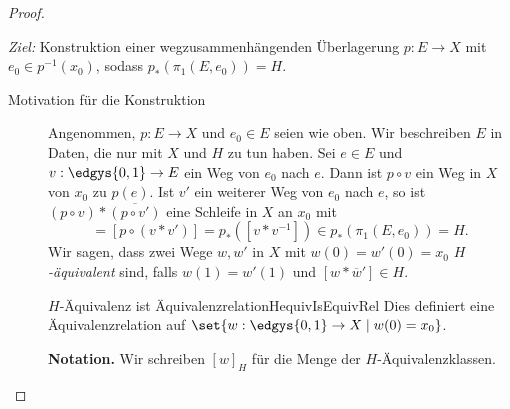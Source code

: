 \documentclass[language=ngerman]{TemplateLecture} %
\begin{document}
\begin{proof}
\begin{description}
        \emph{Ziel:} Konstruktion einer wegzusammenhängenden Überlagerung $p: E \to X$ mit $e_0 \in p^{-1}(x_0)$, sodass $p_*(\pi_1(E, e_0)) = H$.

        \begin{description}
            \item[Motivation für die Konstruktion] Angenommen, $p: E \to X$ und $e_0 \in E$ seien wie oben. Wir beschreiben $E$ in Daten, die nur mit $X$ und $H$ zu tun haben. Sei $e \in E$ und $v: \edgys{0,1} \to E$ ein Weg von $e_0$ nach $e$. Dann ist $p \circ v$ ein Weg in $X$ von $x_0$ zu $p(e)$. Ist $v'$ ein weiterer Weg von $e_0$ nach $e$, so ist $(p \circ v) * \overline{(p \circ v')}$ eine Schleife in $X$ an $x_0$ mit 
            \begin{equation*}
                [(p \circ v) * \overline{(p \circ v')}] = [p \circ (v * v')] = p_*([v * v^{-1}]) \in p_*(\pi_1(E, e_0)) = H.
            \end{equation*} 
            Wir sagen, dass zwei Wege $w, w'$ in $X$ mit $w(0) = w'(0) = x_0$ \emph{$H$-äquivalent} sind, falls $w(1) = w'(1)$ und $[w * \overline{w}'] \in H$.

            \begin{lem}{$H$-Äquivalenz ist Äquivalenzrelation}{HequivIsEquivRel}
                Dies definiert eine Äquivalenzrelation auf $\set{w: \edgys{0,1} \to X \mid w(0) = x_0}$.
            \end{lem}
            \textbf{Notation.} Wir schreiben $[w]_H$ für die Menge der $H$-Äquivalenzklassen. 


\end{description}
\end{description}
\end{proof}
\end{document}
